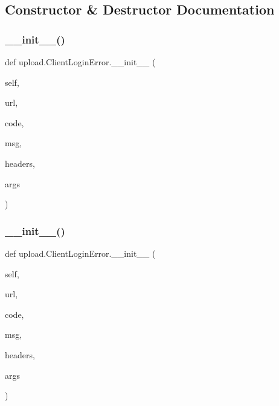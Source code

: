 \subsection{Constructor \& Destructor Documentation}
\mbox{\label{classupload_1_1_client_login_error_a1e590616c2976d881e155958cedbbe47}} 
\subsubsection{\texorpdfstring{\_\_init\_\_()}{\_\_init\_\_()}\hspace{0.1cm}{\footnotesize\ttfamily [1/2]}}
{\footnotesize\ttfamily def upload.\+Client\+Login\+Error.\+\_\+\+\_\+init\+\_\+\+\_\+ (\begin{DoxyParamCaption}\item[{}]{self,  }\item[{}]{url,  }\item[{}]{code,  }\item[{}]{msg,  }\item[{}]{headers,  }\item[{}]{args }\end{DoxyParamCaption})}

\mbox{\label{classupload_1_1_client_login_error_a1e590616c2976d881e155958cedbbe47}} 
\subsubsection{\texorpdfstring{\_\_init\_\_()}{\_\_init\_\_()}\hspace{0.1cm}{\footnotesize\ttfamily [2/2]}}
{\footnotesize\ttfamily def upload.\+Client\+Login\+Error.\+\_\+\+\_\+init\+\_\+\+\_\+ (\begin{DoxyParamCaption}\item[{}]{self,  }\item[{}]{url,  }\item[{}]{code,  }\item[{}]{msg,  }\item[{}]{headers,  }\item[{}]{args }\end{DoxyParamCaption})}



